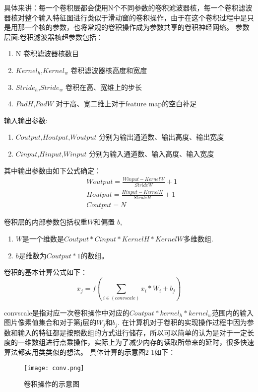 具体来讲：每一个卷积层都会使用N个不同参数的卷积滤波器核，每一个卷积滤波器核对整个输入特征图进行类似于滑动窗的卷积操作，由于在这个卷积过程中是只是用那一个核的参数，也将常规的卷积操作成为参数共享的卷积神经网络。 
参数层面:卷积滤波器核超参数包括：
\begin{enumerate}
\item N 卷积滤波器核数目
\item $Kernel_h$,$Kernel_w$ 卷积滤波器核高度和宽度
\item $Stride_h$,$Stride_w$ 卷积在高、宽维上的步长
\item $PadH$,$PadW$ 对于高、宽二维上对于feature map的空白补足
\end{enumerate}
输入输出参数:\begin{enumerate}
\item $Coutput$,$Houtput$,$Woutput$ 分别为输出通道数、输出高度、输出宽度
\item $Cinput$,$Hinput$,$Winput$    分别为输入通道数、输入高度、输入宽度
\end{enumerate}
其中输出参数由如下公式确定：
\begin{equation}{
\begin{split}
 & Woutput= \frac{Winput-KernelW}{StrideW} +1 \\
 & Houtput= \frac{Hinput-KernelH}{StrideH} +1 \\
 & Coutput= N
\end{split}
}\end{equation}

卷积层的内部参数包括权重$W$和偏置 $b$,
\begin{enumerate}
\item $W$是一个维数是$ Coutput*Cinput*KernelH*KernelW $多维数组.
\item $b$是维数为$Coutput*1$的数组。
\end{enumerate}

卷积的基本计算公式如下： 
\begin{equation}{
 x_j=f(\sum_{i\in (convscale) }x_i*W_i+b_j ) 
}
\end{equation}

convscale是指对应一次卷积操作中对应的$Coutput*kernel_h*kernel_w$范围内的输入图片像素值集合和对于第j层的$W_j$和$b_j$.
在计算机对于卷积的实现操作过程中因为参数和输入的特征都是按照数组的方式进行储存，所以可以简单的认为是对于一定长度的一维数组进行点乘操作，实际上为了减少内存的读取所带来的延时，很多快速算法都实用类类似的想法。 具体计算的示意图2-1如下：
\begin{figure}[!ht]
 \centering
	\texttt{[image: conv.png]}
	\caption{卷积操作的示意图}
\end{figure}

